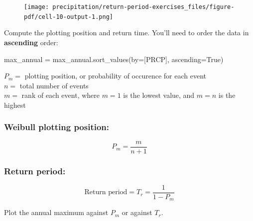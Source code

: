 \documentclass[
  letterpaper,
  DIV=11,
  numbers=noendperiod]{scrreprt}
\newenvironment{Shaded}{\begin{snugshade}}{\end{snugshade}}
\newcommand{\NormalTok}[1]{\textcolor[rgb]{0.00,0.23,0.31}{#1}}
\newcommand{\OperatorTok}[1]{\textcolor[rgb]{0.37,0.37,0.37}{#1}}
\newcommand{\StringTok}[1]{\textcolor[rgb]{0.13,0.47,0.30}{#1}}
\newcommand{\VariableTok}[1]{\textcolor[rgb]{0.07,0.07,0.07}{#1}}
\begin{document}
\begin{figure}[H]

{\centering \texttt{[image: precipitation/return-period-exercises\_files/figure-pdf/cell-10-output-1.png]}

}

\end{figure}

Compute the plotting position and return time. You'll need to order the
data in \textbf{ascending} order:

\begin{Shaded}
\begin{Highlighting}[]
\NormalTok{max\_annual }\OperatorTok{=}\NormalTok{ max\_annual.sort\_values(by}\OperatorTok{=}\NormalTok{[}\StringTok{\textquotesingle{}PRCP\textquotesingle{}}\NormalTok{], ascending}\OperatorTok{=}\VariableTok{True}\NormalTok{)}
\end{Highlighting}
\end{Shaded}

\(P_m=\) plotting position, or probability of occurence for each event\\
\(n=\) total number of events\\
\(m=\) rank of each event, where \(m=1\) is the lowest value, and
\(m=n\) is the highest

\hypertarget{weibull-plotting-position-1}{%
\subsubsection{Weibull plotting
position:}\label{weibull-plotting-position-1}}

\[
P_m = \frac{m}{n+1}
\]

\hypertarget{return-period-3}{%
\subsubsection{Return period:}\label{return-period-3}}

\[
\text{Return period} = T_r = \frac{1}{1-P_m}
\]

Plot the annual maximum against \(P_m\) or against \(T_r\).
\end{document}
